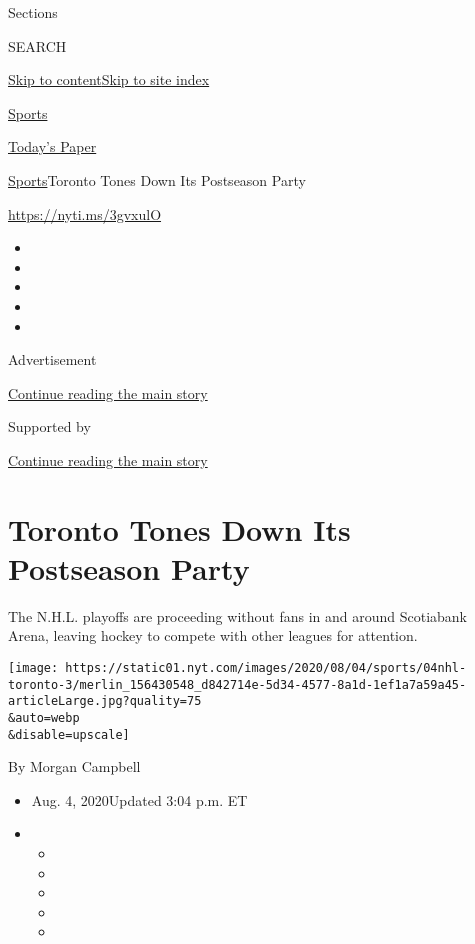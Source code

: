 Sections

SEARCH

\protect\hyperlink{site-content}{Skip to
content}\protect\hyperlink{site-index}{Skip to site index}

\href{https://www.nytimes.com/section/sports}{Sports}

\href{https://myaccount.nytimes.com/auth/login?response_type=cookie\&client_id=vi}{}

\href{https://www.nytimes.com/section/todayspaper}{Today's Paper}

\href{/section/sports}{Sports}\textbar{}Toronto Tones Down Its
Postseason Party

\url{https://nyti.ms/3gvxulO}

\begin{itemize}
\item
\item
\item
\item
\item
\end{itemize}

Advertisement

\protect\hyperlink{after-top}{Continue reading the main story}

Supported by

\protect\hyperlink{after-sponsor}{Continue reading the main story}

\hypertarget{toronto-tones-down-its-postseason-party}{%
\section{Toronto Tones Down Its Postseason
Party}\label{toronto-tones-down-its-postseason-party}}

The N.H.L. playoffs are proceeding without fans in and around Scotiabank
Arena, leaving hockey to compete with other leagues for attention.

\texttt{[image: https://static01.nyt.com/images/2020/08/04/sports/04nhl-toronto-3/merlin\_156430548\_d842714e-5d34-4577-8a1d-1ef1a7a59a45-articleLarge.jpg?quality=75\\\&auto=webp\\\&disable=upscale]}

By Morgan Campbell

\begin{itemize}
\item
  Aug. 4, 2020Updated 3:04 p.m. ET
\item
  \begin{itemize}
  \item
  \item
  \item
  \item
  \item
  \end{itemize}
\end{itemize}

